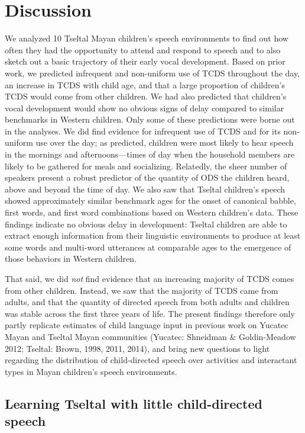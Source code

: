 \documentclass[floatsintext,man]{apa6}
\theoremstyle{definition}
\theoremstyle{definition}
\theoremstyle{definition}
\theoremstyle{remark}
\begin{document}
\hypertarget{disc}{\section{Discussion}\label{disc}}

We analyzed 10 Tseltal Mayan children's speech environments to find out
how often they had the opportunity to attend and respond to speech and
to also sketch out a basic trajectory of their early vocal development.
Based on prior work, we predicted infrequent and non-uniform use of TCDS
throughout the day, an increase in TCDS with child age, and that a large
proportion of children's TCDS would come from other children. We had
also predicted that children's vocal development would show no obvious
signs of delay compared to similar benchmarks in Western children. Only
some of these predictions were borne out in the analyses. We did find
evidence for infrequent use of TCDS and for its non-uniform use over the
day; as predicted, children were most likely to hear speech in the
mornings and afternoons---times of day when the household members are
likely to be gathered for meals and socializing. Relatedly, the sheer
number of speakers present a robust predictor of the quantity of ODS the
children heard, above and beyond the time of day. We also saw that
Tseltal children's speech showed approximately similar benchmark ages
for the onset of canonical babble, first words, and first word
combinations based on Western children's data. These findings indicate
no obvious delay in development: Tseltal children are able to extract
enough information from their linguistic environments to produce at
least some words and multi-word utterances at comparable ages to the
emergence of those behaviors in Western children.

That said, we did \emph{not} find evidence that an increasing majority
of TCDS comes from other children. Instead, we saw that the majority of
TCDS came from adults, and that the quantity of directed speech from
both adults and children was stable across the first three years of
life. The present findings therefore only partly replicate estimates of
child language input in previous work on Yucatec Mayan and Tseltal Mayan
communities (Yucatec: Shneidman \& Goldin-Meadow 2012; Tseltal: Brown,
1998, 2011, 2014), and bring new questions to light regarding the
distribution of child-directed speech over activities and interactant
types in Mayan children's speech environments.

\subsection{Learning Tseltal with little child-directed
speech}\label{learning-tseltal-with-little-child-directed-speech}
\end{document}
